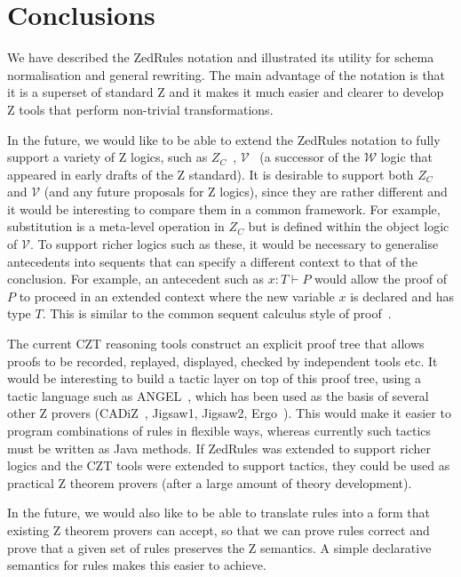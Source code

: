 \documentclass{entcs}
\newcommand{\V}{\mathcal{V}}
\newcommand{\Zc}{Z_C}
\begin{document}
\section{Conclusions} \label{sec:concl}

We have described the ZedRules notation and illustrated its utility
for schema normalisation and general rewriting.  The main advantage
of the notation is that it is a superset of standard Z and it makes it
much easier and clearer to develop Z tools that perform non-trivial
transformations.


In the future, we would like to be able to extend the ZedRules
notation to fully support a variety of Z logics, such as
$\Zc$~\cite{henson:revising-z-1-99,henson:revising-z-2-99},
$\V$~\cite{brien:calculus-schemas-z00} (a successor of the
$\mathcal{W}$ logic that appeared in early drafts of the Z standard).
It is desirable to support both $\Zc$ and $\V$ (and any future
proposals for Z logics), since they are rather different and it would
be interesting to compare them in a common framework.  For example,
substitution is a meta-level operation in $\Zc$ but is defined within
the object logic of $\V$.  To support richer logics such as these, it
would be necessary to generalise antecedents into sequents that can
specify a different context to that of the conclusion.  For example,
an antecedent such as $x:T \vdash P$ would allow the proof of $P$ to
proceed in an extended context where the new variable $x$ is declared
and has type $T$.  This is similar to the common sequent calculus
style of proof~\cite{girard:proofs-types90}.

The current CZT reasoning tools construct an explicit proof tree that
allows proofs to be recorded, replayed, displayed, checked by independent
tools etc.
It would be interesting to build a tactic layer on top of this proof
tree, using a tactic language such as ANGEL~\cite{martin:tactics}, which
has been used as the basis of several other Z provers
(CADiZ~\cite{Toyn98a}, Jigsaw1, Jigsaw2,
Ergo~\cite{martin:tac-lang-for-ergo}).
This would make it easier to program combinations of rules 
in flexible ways, whereas currently such tactics must be written as
Java methods.
If ZedRules was extended to support richer logics and the CZT tools were 
extended to support tactics, they could be used as practical Z theorem
provers (after a large amount of theory development).

In the future, we would also like to be able to translate rules
into a form that existing Z theorem provers can accept, so that we can prove
rules correct and prove that a given set of rules preserves the Z
semantics.  A simple declarative semantics for rules makes this
easier to achieve.



\end{document}
